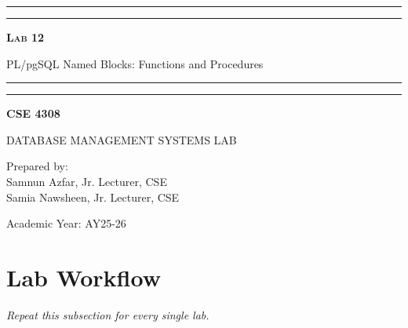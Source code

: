 \documentclass[12pt,a4paper]{article}
\newcommand{\labNo}{Lab 12}
\newcommand{\labTopic}{PL/pgSQL Named Blocks: Functions and Procedures}
\newcommand{\courseCode}{CSE 4308}
\newcommand{\courseTitleLong}{DATABASE MANAGEMENT SYSTEMS LAB}
\newcommand{\instructorName}{Samnun Azfar, Jr. Lecturer, CSE\\ Samia Nawsheen, Jr. Lecturer, CSE}
\newcommand{\academicYear}{AY25-26}
\begin{document}
\begin{titlepage}
    \centering
    \vspace*{2\baselineskip}

    \rule{14cm}{2pt}\vspace*{-0.8\baselineskip}\vspace*{1.5pt}
    \rule{14cm}{0.5pt}\vspace{2\baselineskip}

    {\Huge\bfseries\scshape \labNo\par} %
    \vspace{3mm}
    {\Large \labTopic} %
    \vspace{3mm}

    \rule{14cm}{0.5pt}\vspace*{-0.7\baselineskip}\vspace{2.5pt}
    \rule{14cm}{2pt}

    \vspace{2\baselineskip}

    {\Large\bfseries \courseCode\par} %
    \vspace{1\baselineskip}
    {\large \courseTitleLong\par} %

    \vfill
    {\normalsize Prepared by:\\ \instructorName\par} %
    {\normalsize Academic Year: \academicYear\par} %
\end{titlepage}

\newpage
\tableofcontents
\newpage

\section{Lab Workflow}



\textit{Repeat this subsection for every single lab.}
\end{document}
